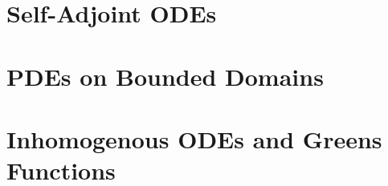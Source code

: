 
\def\npart {IB}
\def\nterm {Michaelmas}
\def\nyear {2022}
\def\nlecturer {Dr E P Shellard}
\def\ncourse {Methods}


\newcommand{\inv}{^{-1}}

\author{Based on lectures by \nlecturer \ and notes by thirdsgames.co.uk}


% 


    \maketitle
    \tableofcontents

    \part{Self-Adjoint ODEs}
    
    
    \part{PDEs on Bounded Domains}
    
    

    \part{Inhomogenous ODEs and Greens Functions}
